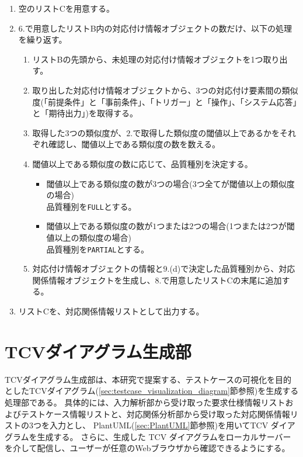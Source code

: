 \begin{enumerate}
\begin{enumerate}
\begin{itemize}
            $7$.(a)の処理に戻り、リストA内の、次の対応付け情報オブジェクトを処理する。
            \item 要求仕様IDおよびテストケースIDが、存在しない場合\\
            取り出した対応付け情報オブジェクトを、$6$.で用意したリストBの末尾に追加する。
        \end{itemize}
    \end{enumerate}
    \item 空のリストCを用意する。
    \item $6$.で用意したリストB内の対応付け情報オブジェクトの数だけ、以下の処理を繰り返す。
    \begin{enumerate}
        \item リストBの先頭から、未処理の対応付け情報オブジェクトを1つ取り出す。
        \item 取り出した対応付け情報オブジェクトから、$3$つの対応付け要素間の類似度(「前提条件」と「事前条件」、「トリガー」と「操作」、「システム応答」と「期待出力」)を取得する。
        \item 取得した3つの類似度が、$2$.で取得した類似度の閾値以上であるかをそれぞれ確認し、閾値以上である類似度の数を数える。
        \item 閾値以上である類似度の数に応じて、品質種別を決定する。
        \begin{itemize}
            \item 閾値以上である類似度の数が$3$つの場合(3つ全てが閾値以上の類似度の場合)\\
            品質種別を\texttt{FULL}とする。
            \item 閾値以上である類似度の数が$1$つまたは$2$つの場合(1つまたは2つが閾値以上の類似度の場合)\\
            品質種別を\texttt{PARTIAL}とする。
        \end{itemize}
        \item 対応付け情報オブジェクトの情報と$9$.(d)で決定した品質種別から、対応関係情報オブジェクトを生成し、$8$.で用意したリストCの末尾に追加する。
    \end{enumerate}
    \item リストCを、対応関係情報リストとして出力する。
\end{enumerate}

\section{TCVダイアグラム生成部}\label{sec:diagram-generation}
TCVダイアグラム生成部は、本研究で提案する、テストケースの可視化を目的としたTCVダイアグラム(\ref{sec:testcase_visualization_diagram}節参照)を生成する処理部である。
具体的には、入力解析部から受け取った要求仕様情報リストおよびテストケース情報リストと、対応関係分析部から受け取った対応関係情報リストの3つを入力とし、
PlantUML(\ref{sec:PlantUML}節参照)を用いてTCV ダイアグラムを生成する。
さらに、生成した TCV ダイアグラムをローカルサーバーを介して配信し、ユーザーが任意のWebブラウザから確認できるようにする。

